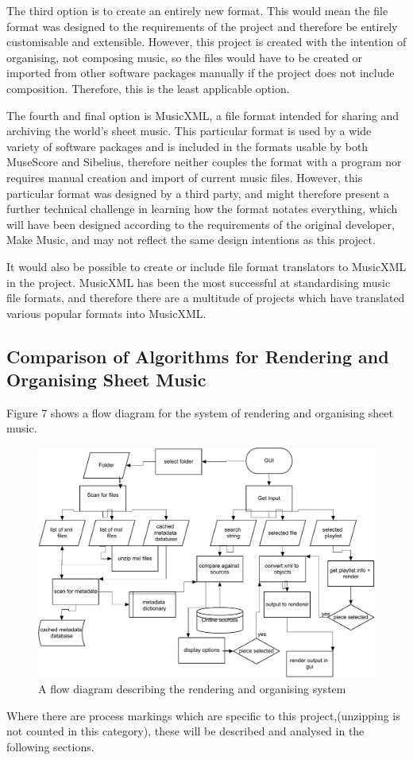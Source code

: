 The third option is to create an entirely new format. This would mean the file format was designed to the requirements of the project and therefore be entirely customisable and extensible. However, this project is created with the intention of organising, not composing music, so the files would have to be created or imported from other software packages manually if the project does not include composition. Therefore, this is the least applicable option.

The fourth and final option is MusicXML, a file format intended for sharing and archiving the world's sheet music\parencite{mxml}. This particular format is used by a wide variety of software packages\parencite{mxml} and is included in the formats usable by both MuseScore\parencite{MuseTour} and Sibelius\parencite{avid}, therefore neither couples the format with a program nor requires manual creation and import of current music files. However, this particular format was designed by a third party, and might therefore present a further technical challenge in learning how the format notates everything, which will have been designed according to the requirements of the original developer, Make Music\parencite{mxml}, and may not reflect the same design intentions as this project.

It would also be possible to create or include file format translators to MusicXML in the project. MusicXML has been the most successful at standardising music file formats\parencite{mxmlSoft}, and therefore there are a multitude of projects which have translated various popular formats into MusicXML.

\subsection{Comparison of Algorithms for Rendering and Organising Sheet Music}
Figure 7 shows a flow diagram for the system of rendering and organising sheet music. \\
\begin{figure}[h]
    \centering
    \includegraphics[width=350pt]{flow-diagram-whole-system-crop}
    \caption{A flow diagram describing the rendering and organising system}
\end{figure}
Where there are process markings which are specific to this project,(unzipping is not counted in this category), these will be described and analysed in the following sections.

